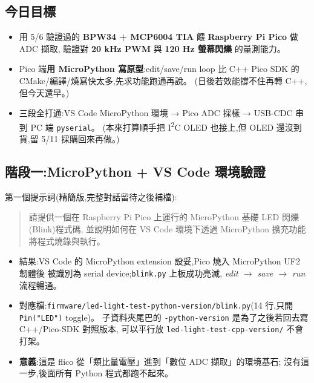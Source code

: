 
\subsection*{今日目標}

\begin{itemize}[leftmargin=2em,itemsep=0pt]
  \item 用 5/6 驗證過的 \textbf{BPW34 + MCP6004 TIA} 餵 \textbf{Raspberry Pi Pico} 做 ADC 擷取,
        驗證對 \textbf{20 kHz PWM} 與 \textbf{120 Hz 螢幕閃爍} 的量測能力。
  \item Pico 端\textbf{用 MicroPython 寫原型}:edit/save/run loop 比 C++ Pico SDK 的
        CMake/編譯/燒寫快太多,先求功能跑通再說。
        (日後若效能撐不住再轉 C++,但今天還早。)
  \item 三段全打通:VS Code MicroPython 環境 → Pico ADC 採樣 → USB-CDC 串到 PC 端 \texttt{pyserial}。
        (本來打算順手把 I\textsuperscript{2}C OLED 也接上,但 OLED 還沒到貨,留 5/11 採購回來再做。)
\end{itemize}

\subsection*{階段一:MicroPython + VS Code 環境驗證}

第一個提示詞(精簡版,完整對話留待之後補檔):

\begin{quote}\small
請提供一個在 Raspberry Pi Pico 上運行的 MicroPython 基礎 LED 閃爍(Blink)程式碼,
並說明如何在 VS Code 環境下透過 MicroPython 擴充功能將程式燒錄與執行。
\end{quote}

\begin{itemize}[leftmargin=2em,itemsep=0pt]
  \item 結果:VS Code 的 MicroPython extension 設妥,Pico 燒入 MicroPython UF2 韌體後
        被識別為 serial device;\texttt{blink.py} 上板成功亮滅,
        \emph{edit \(\to\) save \(\to\) run} 流程暢通。
  \item 對應檔:\texttt{firmware/led-light-test-python-version/blink.py}(14 行,只開 \texttt{Pin("LED")} toggle)。
        子資料夾尾巴的 \texttt{-python-version} 是為了之後若回去寫 C++/Pico-SDK 對照版本,
        可以平行放 \texttt{led-light-test-cpp-version/} 不會打架。
  \item \textbf{意義}:這是 flico 從「類比量電壓」進到「數位 ADC 擷取」的環境基石;
        沒有這一步,後面所有 Python 程式都跑不起來。
\end{itemize}

